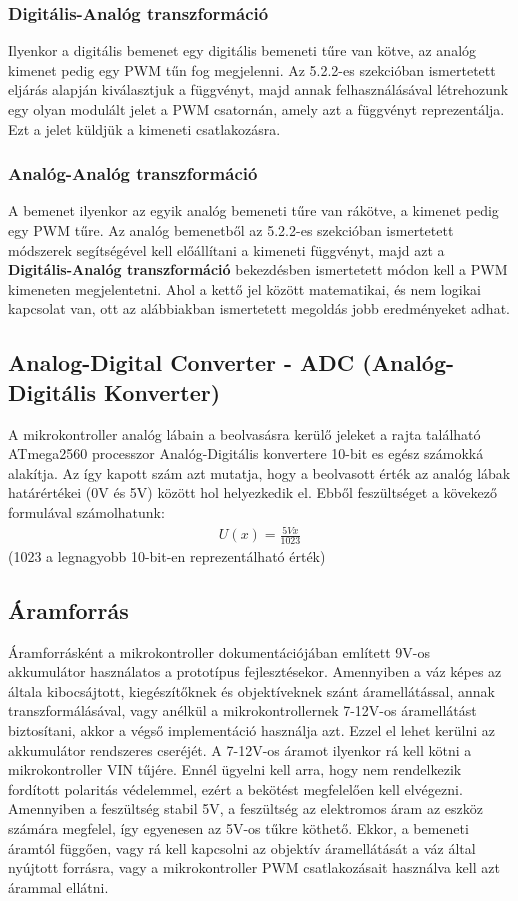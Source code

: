 \subsubsection{Digitális-Analóg transzformáció}
Ilyenkor a digitális bemenet egy digitális bemeneti tűre van kötve, az analóg kimenet pedig egy PWM tűn fog megjelenni. Az 5.2.2-es szekcióban ismertetett eljárás alapján kiválasztjuk a függvényt, majd annak felhasználásával létrehozunk egy olyan modulált jelet a PWM csatornán, amely azt a függvényt reprezentálja. Ezt a jelet küldjük a kimeneti csatlakozásra.
\subsubsection{Analóg-Analóg transzformáció}
A bemenet ilyenkor az egyik analóg bemeneti tűre van rákötve, a kimenet pedig egy PWM tűre. Az analóg bemenetből az 5.2.2-es szekcióban ismertetett módszerek segítségével kell előállítani a kimeneti függvényt, majd azt a \textbf{Digitális-Analóg transzformáció} bekezdésben ismertetett módon kell a PWM kimeneten megjelentetni. Ahol a kettő jel között matematikai, és nem logikai kapcsolat van, ott az alábbiakban ismertetett megoldás jobb eredményeket adhat.
\subsection{Analog-Digital Converter - ADC (Analóg-Digitális Konverter)}
A mikrokontroller analóg lábain a beolvasásra kerülő jeleket a rajta található ATmega2560 processzor\cite{arduino_docs} Analóg-Digitális konvertere 10-bit es egész számokká alakítja\cite{ATmega_processor_datasheet}. Az így kapott szám azt mutatja, hogy a beolvasott érték az analóg lábak határértékei (0V és 5V) között hol helyezkedik el. Ebből feszültséget a kövekező formulával számolhatunk:
\begin{align}
    U(x) = \frac{5Vx}{1023}
\end{align}
\small (1023 a legnagyobb 10-bit-en reprezentálható érték)

\subsection{Áramforrás}
Áramforrásként a  mikrokontroller dokumentációjában említett 9V-os akkumulátor használatos a prototípus fejlesztésekor. Amennyiben a váz képes az általa kibocsájtott, kiegészítőknek és objektíveknek szánt áramellátással, annak transzformálásával, vagy anélkül a mikrokontrollernek 7-12V-os\cite{arduino_aram} áramellátást biztosítani, akkor a végső implementáció használja azt. Ezzel el lehet kerülni az akkumulátor rendszeres cseréjét. A 7-12V-os áramot ilyenkor rá kell kötni a mikrokontroller VIN tűjére. Ennél ügyelni kell arra, hogy nem rendelkezik fordított polaritás védelemmel, ezért a bekötést megfelelően kell elvégezni.\cite{arduino_docs} Amennyiben a feszültség stabil 5V, a feszültség az elektromos áram az eszköz számára megfelel, így egyenesen az 5V-os tűkre köthető. Ekkor, a bemeneti áramtól függően, vagy rá kell kapcsolni az objektív áramellátását a váz által nyújtott forrásra, vagy a mikrokontroller PWM csatlakozásait használva kell azt árammal ellátni.

